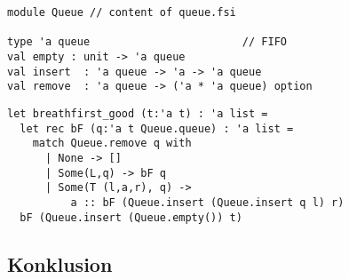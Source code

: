\documentclass[rgb]{beamer}
\begin{document}
\begin{frame}[fragile]
\begin{footnotesize}


\begin{lstlisting}[numbers=none,frame=none,mathescape]
module Queue // content of queue.fsi

type 'a queue                        // FIFO
val empty : unit -> 'a queue
val insert  : 'a queue -> 'a -> 'a queue
val remove  : 'a queue -> ('a * 'a queue) option
\end{lstlisting}


\begin{lstlisting}[numbers=none,frame=none,mathescape]
let breathfirst_good (t:'a t) : 'a list =
  let rec bF (q:'a t Queue.queue) : 'a list =
    match Queue.remove q with
      | None -> []
      | Some(L,q) -> bF q
      | Some(T (l,a,r), q) ->
          a :: bF (Queue.insert (Queue.insert q l) r)
  bF (Queue.insert (Queue.empty()) t)
\end{lstlisting}

\end{footnotesize}
\end{frame}








\subsection*{Konklusion}
\begin{frame}[fragile]

  \vspace{3mm}
  \tableofcontents
\end{frame}
\end{document}
